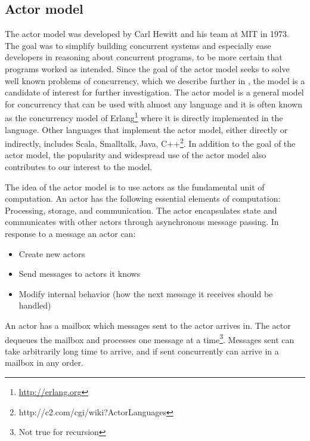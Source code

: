 \subsection{Actor model}
The actor model was developed by Carl Hewitt and his team at MIT in 1973\cite{hewitt1973universal}. The goal was to simplify building concurrent systems and especially ease developers in reasoning about concurrent programs, to be more certain that programs worked as intended\cite[p. 14]{haller2012actors}. Since the goal of the actor model seeks to solve well known problems of concurrency, which we describe further in , the model is a candidate of interest for further investigation. The actor model is a general model for concurrency that can be used with almost any language and it is often known as the concurrency model of Erlang\footnote{\url{http://erlang.org}} where it is directly implemented in the language\cite[p. 115]{sevenModels}. Other languages that implement the actor model, either directly or indirectly, includes Scala, Smalltalk, Java, C++\footnote{http://c2.com/cgi/wiki?ActorLanguages}. In addition to the goal of the actor model,  the popularity and widespread use of the actor model also contributes to our interest to the model.

The idea of the actor model is to use actors as the fundamental unit of computation. An actor has the following essential elements of computation\cite{actorLangNextVideo}: Processing, storage, and communication. The actor encapsulates state and communicates with other actors through asynchronous message passing. In response to a message an actor can\cite{hewitt2014actor}:
\begin{itemize}
\item Create new actors
\item Send messages to actors it knows
\item Modify internal behavior (how the next message it receives should be handled)
\end{itemize}
An actor has a mailbox which messages sent to the actor arrives in. The actor dequeues the mailbox and processes one message at a time\footnote{Not true for recursion\cite{actorLangNextVideo}}. Messages sent can take arbitrarily long time to arrive, and if sent concurrently can arrive in a mailbox in any order\cite{hewitt2014actor}.

